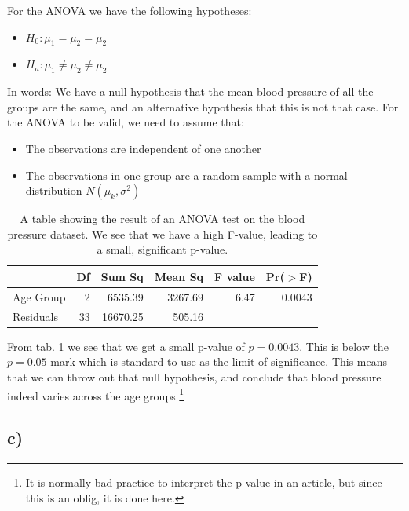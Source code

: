 \documentclass[a4paper,norsk, 10pt]{article}
\begin{document}
For the ANOVA we have the following hypotheses:
\begin{itemize}
  \item $H_0: \mu_1 = \mu_2 = \mu_2$
  \item $H_a:  \mu_1 \neq \mu_2 \neq \mu_2$
\end{itemize}

In words: We have a null hypothesis that the mean blood pressure of all the groups are the same, and an alternative hypothesis that this is not that case. For the ANOVA to be valid, we need to assume that: 

\begin{itemize}
  \item The observations are independent of one another
  \item The observations in one group are a random sample with a normal distribution $N(\mu_k,\sigma^2)$
\end{itemize} 



\begin{table}[!htbp]
\centering
\begin{tabular}{lrrrrr}
  \hline
 & Df & Sum Sq & Mean Sq & F value & Pr($>$F) \\ 
  \hline
Age Group & 2 & 6535.39 & 3267.69 & 6.47 & 0.0043 \\ 
  Residuals & 33 & 16670.25 & 505.16 &  &  \\ 
   \hline
\end{tabular}
\caption{A table showing the result of an ANOVA test on the blood pressure dataset. We see that we have a high F-value, leading to a small, significant p-value.}\label{tab:blood_anova}

\end{table}


From tab. \ref{tab:blood_anova} we see that we get a small p-value of $p=0.0043$. This is below the $p=0.05$ mark which is standard to use as the limit of significance. This means that we can throw out that null hypothesis, and conclude that blood pressure indeed varies across the age groups \footnote{It is normally bad practice to interpret the p-value in an article, but since this is an oblig, it is done here.}


\subsection*{c)}
\end{document}
